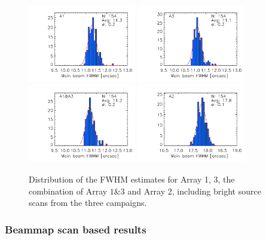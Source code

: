 \begin{figure}[ht!]
\begin{center}
  \includegraphics[clip, width=0.42\textwidth]{Figures/Beams/plot_histo_FWHM_mb_radius_binning2_a1.pdf}
  \includegraphics[clip, width=0.42\textwidth]{Figures/Beams/plot_histo_FWHM_mb_radius_binning2_a3.pdf}
  \includegraphics[clip, width=0.42\textwidth]{Figures/Beams/plot_histo_FWHM_mb_radius_binning2_1mm.pdf}
  \includegraphics[clip, width=0.42\textwidth]{Figures/Beams/plot_histo_FWHM_mb_radius_binning2_a2.pdf}
  \caption[Main Beam FWHM distributions]{Distribution of the FWHM estimates for Array 1, 3, the combination of Array $1\&3$ and Array 2, including bright source scans from the three campaigns.}
\label{fig:fwhm_map}
\end{center}
\end{figure}

\subsubsection{Beammap scan based results}
\label{se:mb_with_beammap}

